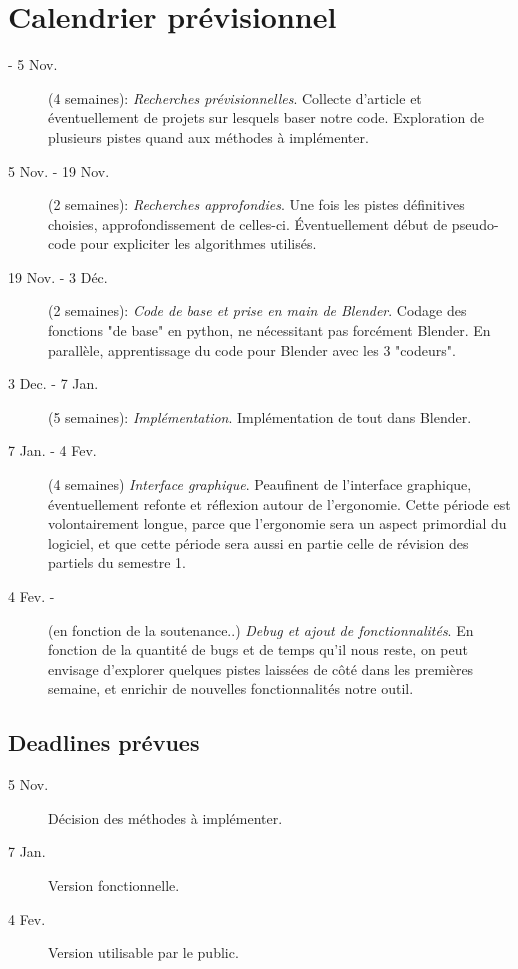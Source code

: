 \documentclass[a4paper,12pt]{article}
\begin{document}
\section{Calendrier prévisionnel}
\begin{description}
  \item[- 5 Nov.] (4 semaines):  \textit{Recherches prévisionnelles}. Collecte d'article et éventuellement de projets sur lesquels baser notre code. Exploration de plusieurs pistes quand aux méthodes à implémenter.
  \item[5 Nov. - 19 Nov.] (2 semaines): \textit{Recherches approfondies}. Une fois les pistes définitives choisies, approfondissement de celles-ci. Éventuellement début de pseudo-code pour expliciter les algorithmes utilisés.
  \item[19 Nov. - 3 Déc.] (2 semaines): \textit{Code de base et prise en main de Blender}. Codage des fonctions "de base" en python, ne nécessitant pas forcément Blender. En parallèle, apprentissage du code pour Blender avec les 3 "codeurs".
  \item[3 Dec. - 7 Jan.] (5 semaines): \textit{Implémentation}. Implémentation de tout dans Blender.
  \item[7 Jan. - 4 Fev.] (4 semaines) \textit{Interface graphique}. Peaufinent de l'interface graphique, éventuellement refonte et réflexion autour de l'ergonomie. Cette période est volontairement longue, parce que l'ergonomie sera un aspect primordial du logiciel, et que cette période sera aussi en partie celle de révision des partiels du semestre 1.
  \item[4 Fev. -] (en fonction de la soutenance..) \textit{Debug et ajout de fonctionnalités}.
  En fonction de la quantité de bugs et de temps qu'il nous reste, on peut envisage d'explorer quelques pistes laissées de côté dans les premières semaine, et enrichir de nouvelles fonctionnalités notre outil.
\end{description}

\subsection*{Deadlines prévues}
\begin{description}
  \item[5 Nov.] Décision des méthodes à implémenter. 
  \item[7 Jan.] Version fonctionnelle.
  \item[4 Fev.] Version utilisable par le public.
\end{description}
\end{document}
